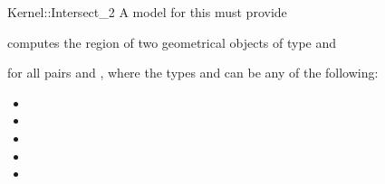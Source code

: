 \begin{ccRefFunctionObjectConcept}{Kernel::Intersect_2}
A model for this must provide


{computes the  region of two geometrical objects of type 
 and }

for all pairs  and , where
the types  and  can be any of the
following:
\begin{itemize}
\item {}
\item {}
\item {}
\item {}
\item {}
\end{itemize}

\ccIsModel{}

\end{ccRefFunctionObjectConcept}
